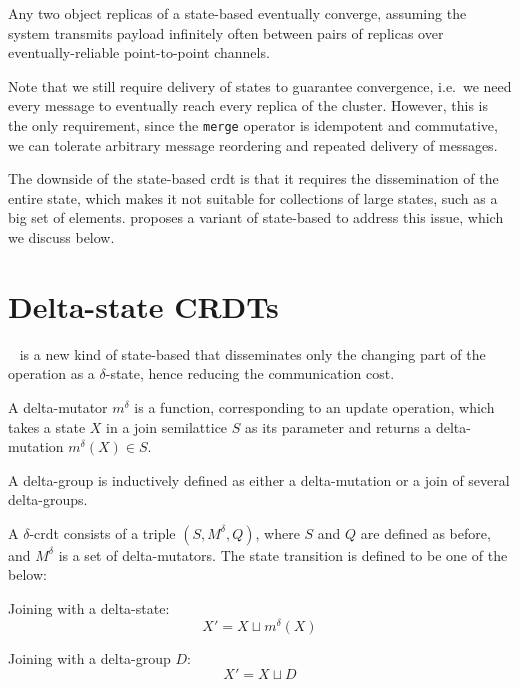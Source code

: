 \begin{proposition} \label{prop:crdt convergence}
  Any two object replicas of a state-based  eventually converge, 
  assuming the
  system transmits payload infinitely often between pairs of replicas over
  eventually-reliable point-to-point channels.
\end{proposition}

Note that we still require delivery of states to guarantee convergence,
i.e.\ we need every message to eventually reach every replica of the cluster.
However, this is the only requirement, since the \verb|merge| operator is idempotent and
commutative, we can tolerate arbitrary message reordering and repeated delivery
of messages.

The downside of the state-based \acrshort{crdt} is that it requires the dissemination
of the entire state, which makes it not suitable for collections of large states,
such as a big set of elements. \citet{almeida2018DeltaCRDT} proposes a variant
of state-based  to address this issue, which we discuss below.

\section{Delta-state CRDTs} \label{subsec:delta state-based}

~\cite{almeida2018DeltaCRDT} is a new kind of state-based 
 that disseminates only the changing part of the operation as 
a \(\delta\)-state, hence reducing the communication cost.

\begin{definition}
  A delta-mutator \(m^\delta\) is a function, corresponding to an update operation, 
  which takes a state \(X\) in a join semilattice \(S\) as its parameter and returns
  a delta-mutation \(m^\delta(X) \in S\).
\end{definition}

\begin{definition}
  A delta-group is inductively defined as either a delta-mutation or a join of
  several delta-groups. 
\end{definition}

\begin{definition}
  A \(\delta\)-\acrshort{crdt} consists of a triple \((S, M^\delta, Q)\), where
  \(S\) and \(Q\) are defined as before, and \(M^\delta\) is a set of delta-mutators.
  The state transition is defined to be one of the below:

  Joining with a delta-state:
  \[
    X' = X\sqcup m^\delta(X) 
  \]

  Joining with a delta-group \(D\):
  \[
    X' = X\sqcup D 
  \]
\end{definition}

